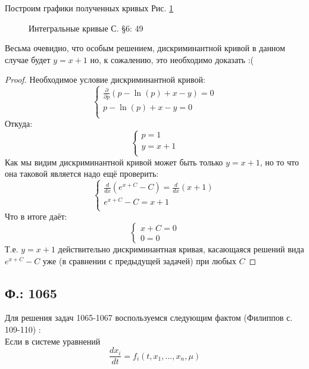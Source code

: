 \documentclass{article}
\begin{document}
Построим графики полученных кривых Рис. \ref{fig:6.49}
\begin{figure}[ht]
    \caption{Интегральные кривые С. \S6: 49}
    \label{fig:6.49}
\end{figure}
\newline
Весьма очевидно, что особым решением, дискриминантной кривой в данном случае будет $y=x+1$ но, к сожалению, это необходимо доказать :(
\begin{proof}
Необходимое условие дискриминантной кривой:
\begin{equation}
    \begin{cases}
    \frac{\partial}{\partial p}(p - \ln(p) + x - y) = 0\\
    p - \ln(p) + x -y=0\\
    \end{cases}
\end{equation}
Откуда:
\begin{equation}
    \begin{cases}
    p=1\\
    y=x+1\\
    \end{cases}
\end{equation}
Как мы видим дискриминантной кривой может быть только $y=x+1$, но то что она таковой является надо ещё проверить:
\begin{equation}
    \begin{cases}
    \frac{d}{d x}(e^{x+C}-C)=\frac{d}{d x}(x+1)\\
    e^{x+C}-C=x+1\\
    \end{cases}
\end{equation}
Что в итоге даёт:
\begin{equation}
    \begin{cases}
    x+C=0\\
    0=0
    \end{cases}
\end{equation}
Т.е. $y=x+1$ действительно дискриминантная кривая, касающаяся решений  вида $e^{x+C}-C$ уже (в сравнении с предыдущей задачей) при любых $C$
\end{proof}

\subsection{Ф.: 1065}
Для решения задач 1065-1067 воспользуемся следующим фактом (Филиппов с. 109-110) :\\
Если в системе уравнений 
\begin{equation}
\label{eq2}
    \frac{d x_i}{d t} = f_i(t,x_1, ... , x_n, \mu) 
\end{equation}
\end{document}
